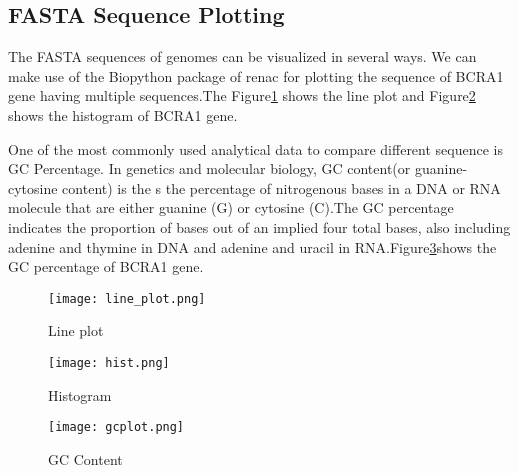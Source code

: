 \documentclass{article}
\begin{document}
\subsection{FASTA Sequence Plotting}
The FASTA sequences of genomes can be visualized in several ways. We can make use of the Biopython package of renac for plotting the sequence of BCRA1 gene having multiple sequences.The Figure\ref{Figure:2} shows the line plot and  Figure\ref{Figure:3} shows the histogram of BCRA1 gene.

One of the most commonly used analytical data to compare different sequence is GC Percentage. In genetics and molecular biology, GC content(or guanine-cytosine content) is the s the percentage of nitrogenous bases in a DNA or RNA molecule that are either guanine (G) or cytosine (C)\cite{protozanova2006base}.The GC percentage indicates the proportion of 
bases out of an implied four total bases, also including adenine and thymine in DNA and adenine and uracil in RNA.Figure\ref{Figure:4}shows the GC percentage of BCRA1 gene.
\begin{figure}
    \centering
    \texttt{[image: line\_plot.png]}
    \caption{Line plot}
    \label{Figure:2}
\end{figure}

\begin{figure}
    \centering
    \texttt{[image: hist.png]}
    \caption{Histogram}
    \label{Figure:3}
\end{figure}

\begin{figure}
    \centering
    \texttt{[image: gcplot.png]}
    \caption{GC Content}
    \label{Figure:4}
\end{figure}













 

\end{document}
